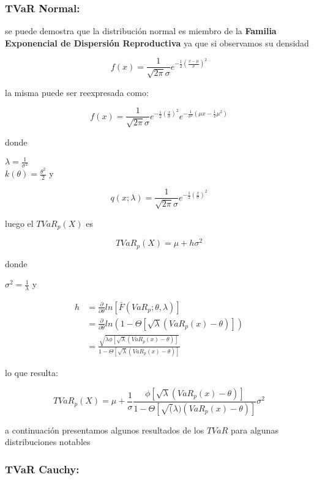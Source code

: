 \documentclass[]{article}
\begin{document}
\hypertarget{tvar-normal}{%
\subsubsection{\texorpdfstring{\textbf{TVaR
Normal:}}{TVaR Normal:}}\label{tvar-normal}}

se puede demostra que la distribución normal es miembro de la
\textbf{Familia Exponencial de Dispersión Reproductiva} ya que si
observamos su densidad

\[f(x)=\frac{1}{\sqrt{2 \pi}\sigma} e^{-\frac{1}{2}\left(\frac{x - \mu}{\sigma}\right)^2}\]

la misma puede ser reexpresada como:

\[f(x)=\frac{1}{\sqrt{2 \pi}\sigma} e^{-\frac{1}{2}\left(\frac{x}{\sigma}\right)^2}e^{-\frac{1}{\sigma^2}\left(\mu x -\frac{1}{2} \mu ^2\right)}\]

donde

\(\lambda = \frac{1}{\sigma^2}\)\\
\(k(\theta)= \frac{\theta^2}{2}\) y

\[q(x; \lambda) = \frac{1}{\sqrt{2 \pi}\sigma}e^{-\frac{1}{2}\left(\frac{x}{\sigma}\right)^2}\]

luego el \(TVaR_p(X)\) es

\[TVaR_p(X)= \mu + h \sigma^2\]

donde

\(\sigma^2= \frac{1}{\lambda}\) y

\[\begin{array}{rl}
h &\displaystyle =\frac{\partial}{\partial \theta}ln[\bar{F}(VaR_p; \theta, \lambda)]\\
&\displaystyle =\frac{\partial}{\partial \theta}ln(1-\Theta[\sqrt{\lambda}(VaR_p(x)-\theta)])\\
&\displaystyle = \frac{\sqrt{\lambda \phi[\sqrt{\lambda}(VaR_p(x)-\theta)]}}{1-\Theta[\sqrt{\lambda}(VaR_p(x)- \theta)]}
\end{array}\]

lo que resulta:

\[TVaR_p(X) = \mu + \frac{1}{\sigma} \frac{\phi[\sqrt{\lambda}(VaR_p(x)- \theta)]}{1-\Theta[\sqrt(\lambda)(VaR_p(x)- \theta)]} \sigma^2\]

a continuación presentamos algunos resultados de los \(TVaR\) para
algunas distribuciones notables

\hypertarget{tvar-cauchy}{%
\subsubsection{\texorpdfstring{\textbf{TVaR
Cauchy:}}{TVaR Cauchy:}}\label{tvar-cauchy}}
\end{document}
